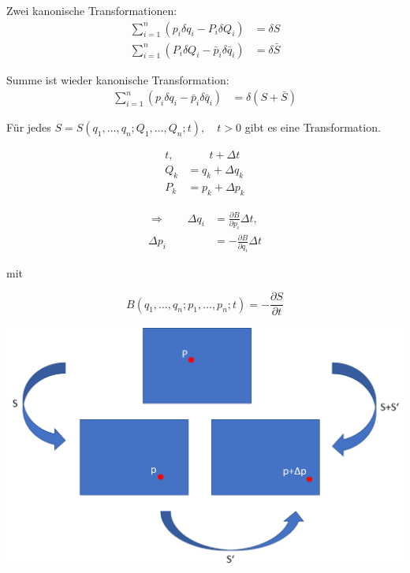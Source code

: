 \begin{frame}
    Zwei kanonische Transformationen:
    \begin{align*}
        \sum_{i=1}^{n} (p_i \delta q_i - P_i \delta Q_i) &= \delta S \\
        \sum_{i=1}^{n} (P_i \delta Q_i - \bar{p}_i \delta \bar{q}_i) &= \delta \bar{S}
    \end{align*}
    
    Summe ist wieder kanonische Transformation:
        \begin{align*}
        \sum_{i=1}^{n} (p_i \delta q_i - \bar{p}_i \delta \bar{q}_i) &= \delta (S + \bar{S}) 
        \end{align*}
        
    Für jedes $S=S(q_1,\ldots,q_n; Q_1,\ldots,Q_n;t),\quad t>0$ gibt es eine Transformation.
    
\end{frame}


\begin{frame}
    \begin{align*}
        t,&\qquad t+\Delta t \\
        Q_k &= q_k + \Delta q_k \\
        P_k &= p_k + \Delta p_k
    \end{align*}
    
    \begin{align*}
        \Longrightarrow \qquad \Delta q_i &= \frac{\partial B}{\partial p_i} \Delta t,\\
                         \Delta p_i &= -\frac{\partial B}{\partial q_i} \Delta t
    \end{align*}
    
    mit
    
    \begin{displaymath}
        B(q_1,\ldots,q_n; p_1,\ldots,p_n;t) = -\frac{\partial S}{\partial t}
    \end{displaymath}
\end{frame}

\begin{frame}
\hspace*{-2.2cm}\includegraphics[scale=0.375]{images/ImagTrans}
\end{frame}

